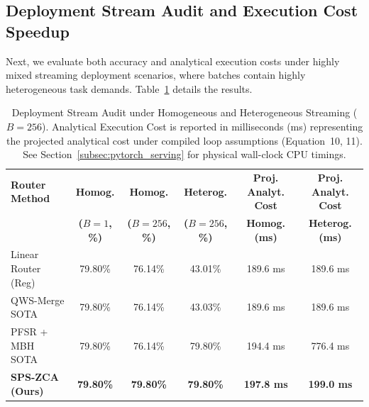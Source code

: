\subsection{Deployment Stream Audit and Execution Cost Speedup}
Next, we evaluate both accuracy and analytical execution costs under highly mixed streaming deployment scenarios, where batches contain highly heterogeneous task demands. Table~\ref{tab:stream_audit} details the results.

\begin{table}[t]
\centering
\caption{Deployment Stream Audit under Homogeneous and Heterogeneous Streaming ($B=256$). Analytical Execution Cost is reported in milliseconds (ms) representing the projected analytical cost under compiled loop assumptions (Equation~10, 11). See Section~\ref{subsec:pytorch_serving} for physical wall-clock CPU timings.}
\label{tab:stream_audit}
\vskip 0.1in
\setlength{\tabcolsep}{3pt}
\small
\begin{tabular}{lccccc}
\toprule
\textbf{Router Method} & \textbf{Homog.} & \textbf{Homog.} & \textbf{Heterog.} & \textbf{Proj. Analyt. Cost} & \textbf{Proj. Analyt. Cost} \\
 & \textbf{($B=1$, \%)} & \textbf{($B=256$, \%)} & \textbf{($B=256$, \%)} & \textbf{Homog. (ms)} & \textbf{Heterog. (ms)} \\
\midrule
Linear Router (Reg) & 79.80\% & 76.14\% & 43.01\% & 189.6 ms & 189.6 ms \\
QWS-Merge SOTA & 79.80\% & 76.14\% & 43.03\% & 189.6 ms & 189.6 ms \\
PFSR + MBH SOTA & 79.80\% & 76.14\% & 79.80\% & 194.4 ms & 776.4 ms \\
\textbf{SPS-ZCA (Ours)} & \textbf{79.80\%} & \textbf{79.80\%} & \textbf{79.80\%} & \textbf{197.8 ms} & \textbf{199.0 ms} \\
\bottomrule
\end{tabular}
\end{table}

